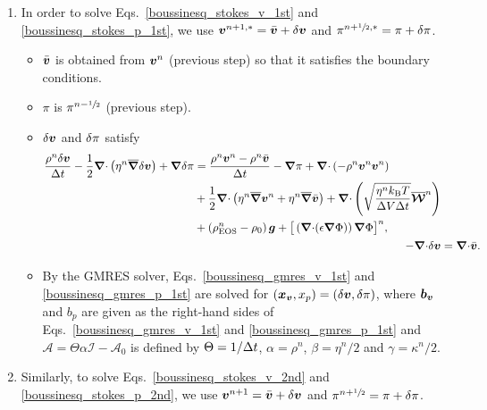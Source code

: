 \documentclass[
10pt
showpacs, showkeys,
amsmath,amssymb,
aps,
pre,
floatfix,
]{revtex4-1}
\newcommand{\divg}{{\V\nabla\cdot}}                       %
\begin{document}
\begin{enumerate}

\item In order to solve Eqs.~\eqref{boussinesq_stokes_v_1st} and \eqref{boussinesq_stokes_p_1st}, we use $\boldsymbol{v}^{n+1,*}=\bar{\boldsymbol{v}}+\delta\boldsymbol{v}$ and $\pi^{n+\sfrac{1}{2},*}=\pi+\delta\pi$.

\begin{itemize}
\item $\bar{\boldsymbol{v}}$ is obtained from $\boldsymbol{v}^n$ (previous step) so that it satisfies the boundary conditions.
\item $\pi$ is $\pi^{n-\sfrac{1}{2}}$ (previous step).
\item $\delta\boldsymbol{v}$ and $\delta\pi$ satisfy
\begin{align}
\label{boussinesq_gmres_v_1st}
\begin{split}
\frac{\rho^n\d{\V{v}}}{\D{t}} - \frac{1}{2}\divg\left(\eta^n\overline{\grad}\d{\V{v}}\right) + \grad\d{\pi}
& = \frac{\rho^n\V{v}^n-\rho^n\bar{\V{v}}}{\D{t}} - \grad\pi 
+ \divg\left(-\rho^n\V{v}^n\V{v}^n\right) \\
& + \frac{1}{2}\divg\left( \eta^n\overline{\grad}\V{v}^n + \eta^n\overline{\grad}\bar{\V{v}} \right)
+ \divg\left( \sqrt{\frac{\eta^n k_\mathrm{B}T}{\D{V}\D{t}} } \overline{\V{\mathcal{W}}}^n \right) \\
& + \left(\rho^n_\mathrm{EOS}-\rho_0\right)\V{g} + \big[\left(\divg(\epsilon\grad\Phi)\right)\grad\Phi\big]^n,
\end{split} \\
\label{boussinesq_gmres_p_1st}
-\divg\d{\V{v}} &= \divg\bar{\V{v}}.
\end{align}
\item By the GMRES solver, Eqs.~\eqref{boussinesq_gmres_v_1st} and \eqref{boussinesq_gmres_p_1st} are solved for $(\boldsymbol{x}_{\boldsymbol{v}},x_p)=(\delta\boldsymbol{v},\delta\pi)$, where $\boldsymbol{b}_{\boldsymbol{v}}$ and $b_p$ are given as the right-hand sides of Eqs.~\eqref{boussinesq_gmres_v_1st} and \eqref{boussinesq_gmres_p_1st} and $\mathcal{A}=\Theta\alpha\mathcal{I}-\mathcal{A}_0$ is defined by $\Theta=1/\Delta t$, $\alpha=\rho^n$, $\beta=\eta^n/2$ and $\gamma=\kappa^n/2$.
\end{itemize}

\item Similarly, to solve Eqs.~\eqref{boussinesq_stokes_v_2nd} and \eqref{boussinesq_stokes_p_2nd}, we use $\boldsymbol{v}^{n+1}=\bar{\boldsymbol{v}}+\delta\boldsymbol{v}$ and $\pi^{n+\sfrac{1}{2}}=\pi+\delta\pi$.


\end{enumerate}
\end{document}
